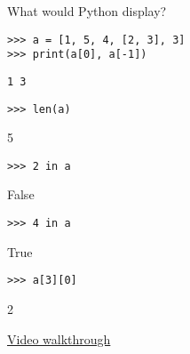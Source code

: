 \question What would Python display?

\begin{lstlisting}
>>> a = [1, 5, 4, [2, 3], 3]
>>> print(a[0], a[-1])
\end{lstlisting}
\begin{solution}[.25in]
\begin{lstlisting}
1 3
\end{lstlisting}
\end{solution}

\begin{lstlisting}
>>> len(a)
\end{lstlisting}
\begin{solution}[.25in]
5
\end{solution}

\begin{lstlisting}
>>> 2 in a
\end{lstlisting}
\begin{solution}[.25in]
False
\end{solution}

\begin{lstlisting}
>>> 4 in a
\end{lstlisting}
\begin{solution}[.25in]
True
\end{solution}

\begin{lstlisting}
>>> a[3][0]
\end{lstlisting}
\begin{solution}[.25in]
2
\end{solution}
\begin{solution}
\href{https://www.youtube.com/watch?v=zP4jWZpwACM&index=1&list=PLx38hZJ5RLZcgrSJp16YmzNwn9hL5JD8q&vq=hd1080&t=14m22s}{Video walkthrough}
\end{solution}
